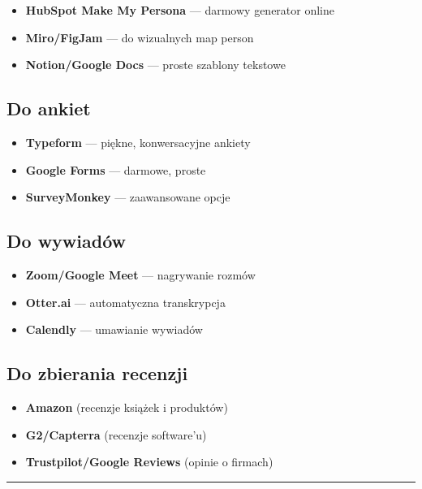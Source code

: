 \documentclass[
  12pt,
  a4paper,
  twoside,
  openright,
  12pt,
  DIV=12,
  BCOR=12mm]{scrbook}
\providecommand{\tightlist}{%
  \setlength{\itemsep}{0pt}\setlength{\parskip}{0pt}}\usepackage{longtable,booktabs,array}
\newcommand{\decoline}{%
  \begin{center}
    \textcolor{bordergray}{\rule{0.3\textwidth}{0.5pt}}
  \end{center}
}
\begin{document}
\begin{itemize}
\tightlist
\item
  \textbf{HubSpot Make My Persona} --- darmowy generator online
\item
  \textbf{Miro/FigJam} --- do wizualnych map person
\item
  \textbf{Notion/Google Docs} --- proste szablony tekstowe
\end{itemize}

\subsection{Do ankiet}\label{do-ankiet}

\begin{itemize}
\tightlist
\item
  \textbf{Typeform} --- piękne, konwersacyjne ankiety
\item
  \textbf{Google Forms} --- darmowe, proste
\item
  \textbf{SurveyMonkey} --- zaawansowane opcje
\end{itemize}

\subsection{Do wywiadów}\label{do-wywiaduxf3w}

\begin{itemize}
\tightlist
\item
  \textbf{Zoom/Google Meet} --- nagrywanie rozmów
\item
  \textbf{Otter.ai} --- automatyczna transkrypcja
\item
  \textbf{Calendly} --- umawianie wywiadów
\end{itemize}

\subsection{Do zbierania recenzji}\label{do-zbierania-recenzji}

\begin{itemize}
\tightlist
\item
  \textbf{Amazon} (recenzje książek i produktów)
\item
  \textbf{G2/Capterra} (recenzje software'u)
\item
  \textbf{Trustpilot/Google Reviews} (opinie o firmach)
\end{itemize}

\decoline
\end{document}
